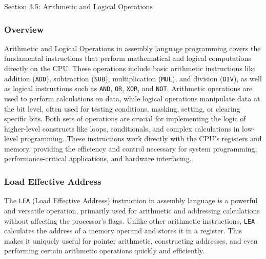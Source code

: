 \begin{notes}{Section 3.5: Arithmetic and Logical Operations}
    \subsubsection*{Overview}

    Arithmetic and Logical Operations in assembly language programming covers the fundamental instructions that perform mathematical and logical computations directly on the CPU. These operations 
    include basic arithmetic instructions like addition (\texttt{ADD}), subtraction (\texttt{SUB}), multiplication (\texttt{MUL}), and division (\texttt{DIV}), as well as logical instructions such 
    as \texttt{AND}, \texttt{OR}, \texttt{XOR}, and \texttt{NOT}. Arithmetic operations are used to perform calculations on data, while logical operations manipulate data at the bit level, often used 
    for testing conditions, masking, setting, or clearing specific bits. Both sets of operations are crucial for implementing the logic of higher-level constructs like loops, conditionals, and complex 
    calculations in low-level programming. These instructions work directly with the CPU's registers and memory, providing the efficiency and control necessary for system programming, performance-critical 
    applications, and hardware interfacing. \vspace*{1em}

    \subsubsection*{Load Effective Address}

    The \texttt{LEA} (Load Effective Address) instruction in assembly language is a powerful and versatile operation, primarily used for arithmetic and addressing calculations without affecting the 
    processor's flags. Unlike other arithmetic instructions, \texttt{LEA} calculates the address of a memory operand and stores it in a register. This makes it uniquely useful for pointer arithmetic, 
    constructing addresses, and even performing certain arithmetic operations quickly and efficiently.
    

\end{notes}
